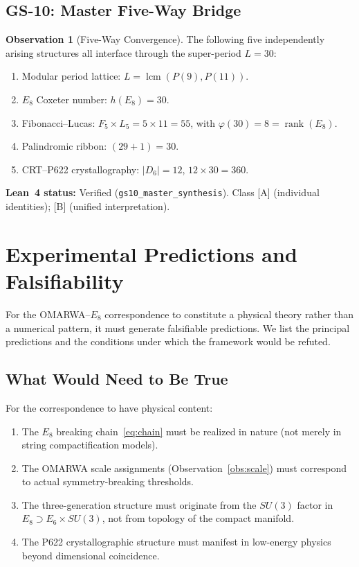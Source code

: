 \documentclass[11pt, a4paper]{article}
\theoremstyle{plain}
\theoremstyle{definition}
\newtheorem{observation}{Observation}[section]
\theoremstyle{remark}
\DeclareMathOperator{\lcm}{lcm}
\DeclareMathOperator{\rank}{rank}
\begin{document}
\subsection{GS-10: Master Five-Way Bridge}

\begin{observation}[Five-Way Convergence]
\label{obs:gs10}
The following five independently arising structures all interface
through the super-period $L = 30$:
\begin{enumerate}
  \item Modular period lattice: $L = \lcm(P(9), P(11))$.
  \item $E_8$ Coxeter number: $h(E_8) = 30$.
  \item Fibonacci--Lucas: $F_5 \times L_5 = 5 \times 11 = 55$, with
    $\varphi(30) = 8 = \rank(E_8)$.
  \item Palindromic ribbon: $(29 + 1) = 30$.
  \item CRT--P622 crystallography: $|D_6| = 12$, $12 \times 30 = 360$.
\end{enumerate}
\end{observation}

\textbf{Lean~4 status:} Verified (\texttt{gs10\_master\_synthesis}). Class [A] (individual identities); [B] (unified interpretation).

\section{Experimental Predictions and Falsifiability}
\label{sec:predictions}

For the OMARWA--$E_8$ correspondence to constitute a physical theory
rather than a numerical pattern, it must generate falsifiable
predictions. We list the principal predictions and the conditions
under which the framework would be refuted.

\subsection{What Would Need to Be True}

For the correspondence to have physical content:
\begin{enumerate}
  \item The $E_8$ breaking chain~\eqref{eq:chain} must be realized
    in nature (not merely in string compactification models).
  \item The OMARWA scale assignments (Observation~\ref{obs:scale})
    must correspond to actual symmetry-breaking thresholds.
  \item The three-generation structure must originate from the
    $SU(3)$ factor in $E_8 \supset E_6 \times SU(3)$, not from
    topology of the compact manifold.
  \item The P622 crystallographic structure must manifest in
    low-energy physics beyond dimensional coincidence.
\end{enumerate}
\end{document}
